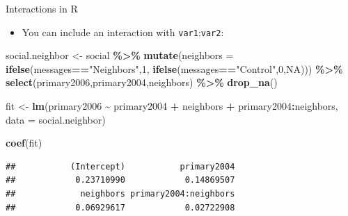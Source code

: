 \documentclass[
  ignorenonframetext,
]{beamer}
\newenvironment{Shaded}{\begin{snugshade}}{\end{snugshade}}
\newcommand{\AttributeTok}[1]{\textcolor[rgb]{0.13,0.29,0.53}{#1}}
\newcommand{\ConstantTok}[1]{\textcolor[rgb]{0.56,0.35,0.01}{#1}}
\newcommand{\DecValTok}[1]{\textcolor[rgb]{0.00,0.00,0.81}{#1}}
\newcommand{\FunctionTok}[1]{\textcolor[rgb]{0.13,0.29,0.53}{\textbf{#1}}}
\newcommand{\NormalTok}[1]{#1}
\newcommand{\OtherTok}[1]{\textcolor[rgb]{0.56,0.35,0.01}{#1}}
\newcommand{\SpecialCharTok}[1]{\textcolor[rgb]{0.81,0.36,0.00}{\textbf{#1}}}
\newcommand{\StringTok}[1]{\textcolor[rgb]{0.31,0.60,0.02}{#1}}
\providecommand{\tightlist}{%
  \setlength{\itemsep}{0pt}\setlength{\parskip}{0pt}}
\begin{document}
\begin{frame}[fragile]{Interactions in R}
\label{interactions-in-r}
\begin{itemize}
\tightlist
\item
  You can include an interaction with \texttt{var1}:\texttt{var2}:
\end{itemize}

\begin{Shaded}
\begin{Highlighting}[]
\NormalTok{social.neighbor }\OtherTok{\textless{}{-}}\NormalTok{ social }\SpecialCharTok{\%\textgreater{}\%}
  \FunctionTok{mutate}\NormalTok{(}\AttributeTok{neighbors =} \FunctionTok{ifelse}\NormalTok{(messages}\SpecialCharTok{==}\StringTok{"Neighbors"}\NormalTok{,}\DecValTok{1}\NormalTok{,}
                            \FunctionTok{ifelse}\NormalTok{(messages}\SpecialCharTok{==}\StringTok{"Control"}\NormalTok{,}\DecValTok{0}\NormalTok{,}\ConstantTok{NA}\NormalTok{))) }\SpecialCharTok{\%\textgreater{}\%}
  \FunctionTok{select}\NormalTok{(primary2006,primary2004,neighbors) }\SpecialCharTok{\%\textgreater{}\%}
  \FunctionTok{drop\_na}\NormalTok{()}
    
\NormalTok{fit }\OtherTok{\textless{}{-}} \FunctionTok{lm}\NormalTok{(primary2006 }\SpecialCharTok{\textasciitilde{}}\NormalTok{ primary2004 }\SpecialCharTok{+}\NormalTok{ neighbors }\SpecialCharTok{+}
\NormalTok{          primary2004}\SpecialCharTok{:}\NormalTok{neighbors, }\AttributeTok{data =}\NormalTok{ social.neighbor)}

\FunctionTok{coef}\NormalTok{(fit)}
\end{Highlighting}
\end{Shaded}

\begin{verbatim}
##           (Intercept)           primary2004 
##            0.23710990            0.14869507 
##             neighbors primary2004:neighbors 
##            0.06929617            0.02722908
\end{verbatim}
\end{frame}
\end{document}
